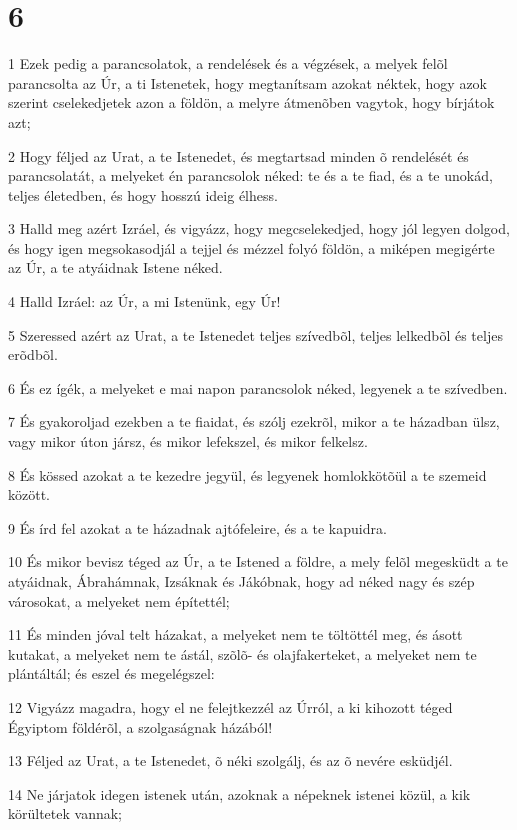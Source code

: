 \chapter{6}

\par 1 Ezek pedig a parancsolatok, a rendelések és a végzések, a melyek felõl parancsolta az Úr, a ti Istenetek, hogy megtanítsam azokat néktek, hogy azok szerint cselekedjetek azon a földön, a melyre átmenõben vagytok, hogy bírjátok azt;
\par 2 Hogy féljed az Urat, a te Istenedet, és megtartsad minden õ rendelését és parancsolatát, a melyeket én parancsolok néked: te és a te fiad, és a te unokád, teljes életedben, és hogy hosszú ideig élhess.
\par 3 Halld meg azért Izráel, és vigyázz, hogy megcselekedjed, hogy jól legyen dolgod, és hogy igen megsokasodjál a tejjel és mézzel folyó földön, a miképen megigérte az Úr, a te atyáidnak Istene néked.
\par 4 Halld Izráel: az Úr, a mi Istenünk, egy Úr!
\par 5 Szeressed azért az Urat, a te Istenedet teljes szívedbõl, teljes lelkedbõl és teljes erõdbõl.
\par 6 És ez ígék, a melyeket e mai napon parancsolok néked, legyenek a te szívedben.
\par 7 És gyakoroljad ezekben a te fiaidat, és szólj ezekrõl, mikor a te házadban ülsz, vagy mikor úton jársz, és mikor lefekszel, és mikor felkelsz.
\par 8 És kössed azokat a te kezedre jegyül, és legyenek homlokkötõül a te szemeid között.
\par 9 És írd fel azokat a te házadnak ajtófeleire, és a te kapuidra.
\par 10 És mikor bevisz téged az Úr, a te Istened a földre, a mely felõl megesküdt a te atyáidnak, Ábrahámnak, Izsáknak és Jákóbnak, hogy ad néked nagy és szép városokat, a melyeket nem építettél;
\par 11 És minden jóval telt házakat, a melyeket nem te töltöttél meg, és ásott kutakat, a melyeket nem te ástál, szõlõ- és olajfakerteket, a melyeket nem te plántáltál; és eszel és megelégszel:
\par 12 Vigyázz magadra, hogy el ne felejtkezzél az Úrról, a ki kihozott téged Égyiptom földérõl, a szolgaságnak házából!
\par 13 Féljed az Urat, a te Istenedet, õ néki szolgálj, és az õ nevére  esküdjél.
\par 14 Ne járjatok idegen istenek után, azoknak a népeknek istenei közül, a kik körültetek vannak;

